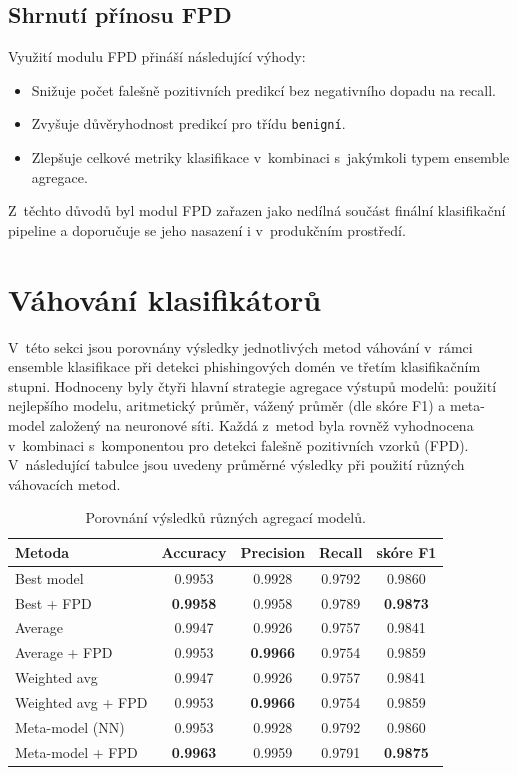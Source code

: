 \subsection*{Shrnutí přínosu FPD}

Využití modulu FPD přináší následující výhody:

\begin{itemize}
    \item Snižuje počet falešně pozitivních predikcí bez negativního dopadu na recall.
    \item Zvyšuje důvěryhodnost predikcí pro třídu \texttt{benigní}.
    \item Zlepšuje celkové metriky klasifikace v~kombinaci s~jakýmkoli typem ensemble agregace.
\end{itemize}

Z~těchto důvodů byl modul FPD zařazen jako nedílná součást finální klasifikační pipeline a doporučuje se jeho nasazení i v~produkčním prostředí.





\section{Váhování klasifikátorů}
\label{res:aggregation_results}

V~této sekci jsou porovnány výsledky jednotlivých metod váhování v~rámci ensemble klasifikace při detekci phishingových domén ve třetím klasifikačním stupni. Hodnoceny byly čtyři hlavní strategie agregace výstupů modelů: použití nejlepšího modelu, aritmetický průměr, vážený průměr (dle skóre F1) a meta-model založený na neuronové síti. Každá z~metod byla rovněž vyhodnocena v~kombinaci s~komponentou pro detekci falešně pozitivních vzorků (FPD). V~následující tabulce jsou uvedeny průměrné výsledky při použití různých váhovacích metod. 

\begin{table}[h!]
\centering
\begin{tabular}{|l|c|c|c|c|}
\hline
\textbf{Metoda} & \textbf{Accuracy} & \textbf{Precision} & \textbf{Recall} & \textbf{skóre F1} \\
\hline
Best model & 0.9953 & 0.9928 & 0.9792 & 0.9860 \\
Best + FPD & \textbf{0.9958} & 0.9958 & 0.9789 & \textbf{0.9873} \\
\hline
Average & 0.9947 & 0.9926 & 0.9757 & 0.9841 \\
Average + FPD & 0.9953 & \textbf{0.9966} & 0.9754 & 0.9859 \\
\hline
Weighted avg & 0.9947 & 0.9926 & 0.9757 & 0.9841 \\
Weighted avg + FPD & 0.9953 & \textbf{0.9966} & 0.9754 & 0.9859 \\
\hline
Meta-model (NN) & 0.9953 & 0.9928 & 0.9792 & 0.9860 \\
Meta-model + FPD & \textbf{0.9963} & 0.9959 & 0.9791 & \textbf{0.9875} \\
\hline
\end{tabular}
\caption{Porovnání výsledků různých agregací modelů. }
\label{tab:aggregation_results}
\end{table}

